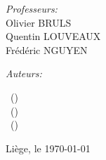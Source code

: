 \begin{titlepage}

\begin{center}
    \begin{minipage}{0.45\linewidth} %
        \raggedright %
        \normalsize \textit{Professeurs:} \\
            \small  Olivier BRULS \\
                    Quentin LOUVEAUX \\
                    Frédéric NGUYEN 
    \end{minipage}
    \begin{minipage}{0.45\linewidth} %
        \raggedleft %
        \normalsize \textit{Auteurs:} \\
        \begin{small}
            \reportauthorOne~(\cidOne)\\
            \reportauthorTwo~(\cidTwo)\\
            \reportauthorThree~(\cidThree)\\
        \end{small}
    \end{minipage}
\end{center}


\vspace{4cm}
\makeatletter
Liège, le \today

\vfill %



\makeatother

\end{titlepage}

